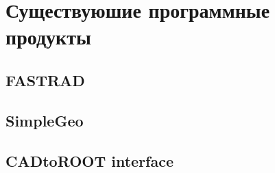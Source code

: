 \section{Существуюшие программные продукты}\label{sec:ExistSols}

\subsection{FASTRAD}\label{sec:secFastrad}

\subsection{SimpleGeo}\label{sec:secSimpleGeo}

\subsection{CADtoROOT interface}\label{sec:secCinzia}
